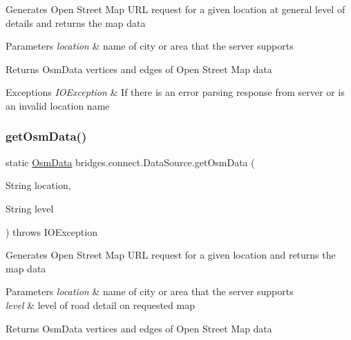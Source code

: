 Generates Open Street Map U\+RL request for a given location at general level of details and returns the map data 
\begin{DoxyParams}{Parameters}
{\em location} & name of city or area that the server supports \\
\hline
\end{DoxyParams}
\begin{DoxyReturn}{Returns}
Osm\+Data vertices and edges of Open Street Map data 
\end{DoxyReturn}

\begin{DoxyExceptions}{Exceptions}
{\em I\+O\+Exception} & If there is an error parsing response from server or is an invalid location name \\
\hline
\end{DoxyExceptions}
\mbox{\label{classbridges_1_1connect_1_1_data_source_a92e5a1b0104cce618012c4ec9c84e8aa}} 
\subsubsection{\texorpdfstring{get\+Osm\+Data()}{getOsmData()}\hspace{0.1cm}{\footnotesize\ttfamily [2/4]}}
{\footnotesize\ttfamily static \hyperlink{classbridges_1_1data__src__dependent_1_1_osm_data}{Osm\+Data} bridges.\+connect.\+Data\+Source.\+get\+Osm\+Data (\begin{DoxyParamCaption}\item[{String}]{location,  }\item[{String}]{level }\end{DoxyParamCaption}) throws I\+O\+Exception\hspace{0.3cm}{\ttfamily [static]}}

Generates Open Street Map U\+RL request for a given location and returns the map data 
\begin{DoxyParams}{Parameters}
{\em location} & name of city or area that the server supports \\
\hline
{\em level} & level of road detail on requested map \\
\hline
\end{DoxyParams}
\begin{DoxyReturn}{Returns}
Osm\+Data vertices and edges of Open Street Map data 
\end{DoxyReturn}

